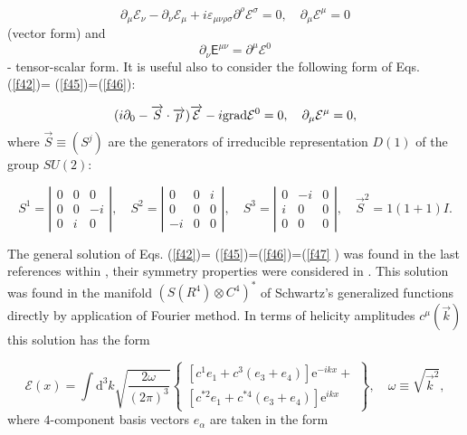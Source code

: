 \documentclass[a4paper,12pt]{article}
\begin{document}
\begin{equation}
\partial _\mu \mathcal{E}_\nu -\partial _\nu \mathcal{E}_\mu +i\varepsilon
_{\mu \nu \rho \sigma }\partial ^\rho \mathcal{E}^\sigma =0,\quad \partial
_\mu \mathcal{E}^\mu =0  \label{f45}
\end{equation}
(vector form) and
\begin{equation}
\partial _\nu \mathsf{E}^{\mu \nu }=\partial ^\mu \mathcal{E}^0  \label{f46}
\end{equation}
- tensor-scalar form. It is useful also to consider the following form of
Eqs. (\ref{f42})= (\ref{f45})=(\ref{f46}):

\begin{equation}
(i\partial _0-\overrightarrow{S}\cdot \overrightarrow{p})\overrightarrow{%
\mathcal{E}}-i\mathrm{grad}\mathcal{E}^0=0,\quad \partial _\mu \mathcal{E}%
^\mu =0,  \label{f47}
\end{equation}
where $\overrightarrow{S}\equiv (S^j)$ are the generators of irreducible
representation $D(1)$ of the group $SU(2)$:

\begin{equation}
S^1=\left|
\begin{array}{ccc}
0 & 0 & 0 \\
0 & 0 & -i \\
0 & i & 0
\end{array}
\right| ,\quad S^2=\left|
\begin{array}{ccc}
0 & 0 & i \\
0 & 0 & 0 \\
-i & 0 & 0
\end{array}
\right| ,\quad S^3=\left|
\begin{array}{ccc}
0 & -i & 0 \\
i & 0 & 0 \\
0 & 0 & 0
\end{array}
\right| ,\quad \overrightarrow{S}^2=1(1+1)I.  \label{f48}
\end{equation}

The general solution of Eqs. (\ref{f42})= (\ref{f45})=(\ref{f46})=(\ref{f47}%
) was found in the last references within \cite{S2}, their symmetry
properties were considered in \cite{SK}. This solution was found in the
manifold $(S(R^4)\otimes C^4)^{*}$ of Schwartz's generalized functions
directly by application of Fourier method. In terms of helicity amplitudes $%
c^\mu (\overrightarrow{k})$ this solution has the form

\begin{equation}
\mathcal{E}\left( x\right) =\int \mathrm{d}^3k\sqrt{\frac{2\omega }{\left(
2\pi \right) ^3}}\left\{
\begin{array}{c}
\left[ c^1e_1+c^3\left( e_3+e_4\right) \right] \mathrm{e}^{-ikx}+ \\
\left[ c^{*2}e_1+c^{*4}\left( e_3+e_4\right) \right] \mathrm{e}^{ikx}
\end{array}
\right\} ,\quad \omega \equiv \sqrt{\overrightarrow{k}^2},  \label{f49}
\end{equation}
where $4$-component basis vectors $e_\alpha $ are taken in the form
\end{document}
